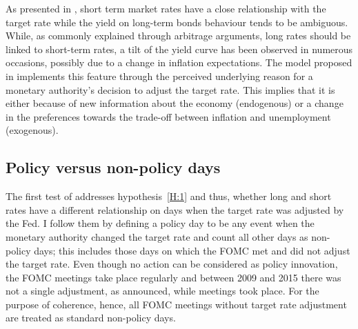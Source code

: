 
As presented in \textcite{Ellingsen.2003}, short term market rates have a close relationship with the target rate while the yield on long-term bonds behaviour tends to be ambiguous. While, as commonly explained through arbitrage arguments, long rates should be linked to short-term rates, a tilt of the yield curve has been observed in numerous occasions, possibly due to a change in inflation expectations. The model proposed in \textcite{Ellingsen.2001} implements this feature through the perceived underlying reason for a monetary authority's decision to adjust the target rate. This implies that it is either because of new information about the economy (endogenous) or a change in the preferences towards the trade-off between inflation and unemployment (exogenous).

\subsection{Policy versus non-policy days}

The first test of \textcite{Ellingsen.2003} addresses hypothesis~\ref{H:1} and thus, whether long and short rates have a different relationship on days when the target rate was adjusted by the Fed. I follow them by defining a policy day to be any event when the monetary authority changed the target rate and count all other days as non-policy days; this includes those days on which the FOMC met and did not adjust the target rate. Even though no action can be considered as policy innovation, the FOMC meetings take place regularly and between 2009 and 2015 there was not a single adjustment, as announced, while meetings took place. For the purpose of coherence, hence, all FOMC meetings without target rate adjustment are treated as standard non-policy days. 

